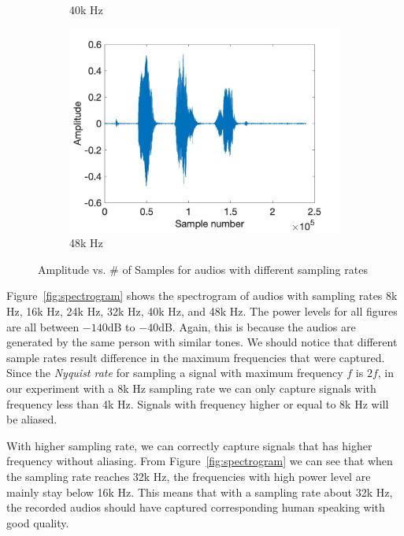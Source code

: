 \documentclass[11pt, oneside]{article}   	%
\begin{document}
\begin{figure}[ht]
\begin{subfigure}[b]{0.3\textwidth}
\caption{40k Hz}
\end{subfigure}
\begin{subfigure}[b]{0.3\textwidth}
\includegraphics[width=\textwidth]{imgs/48k-amplitude.jpg}
\caption{48k Hz}
\end{subfigure}

\caption{Amplitude vs. \# of Samples for  audios with different sampling rates}
\label{fig:amplitude}
\end{figure}

Figure~\ref{fig:spectrogram} shows the spectrogram of audios with sampling rates 8k Hz, 16k Hz, 24k Hz, 32k Hz, 40k Hz, and 48k Hz. The power levels for all figures are all between $-140$dB to $-40$dB. Again, this is because the audios are generated by the same person with similar tones. We should notice that different sample rates result difference in the maximum frequencies that were captured. Since the \emph{Nyquist rate} for sampling a signal with maximum frequency $f$ is $2f$, in our experiment with a 8k Hz sampling rate we can only capture signals with frequency less than 4k Hz. Signals with frequency higher or equal to 8k Hz will be aliased. 

With higher sampling rate, we can correctly capture signals that has higher frequency without aliasing. From Figure~\ref{fig:spectrogram} we can see that when the sampling rate reaches 32k Hz, the frequencies with high power level are mainly stay below 16k Hz. This means that with a sampling rate about 32k Hz, the recorded audios should have captured corresponding human speaking with good quality.
\end{document}
